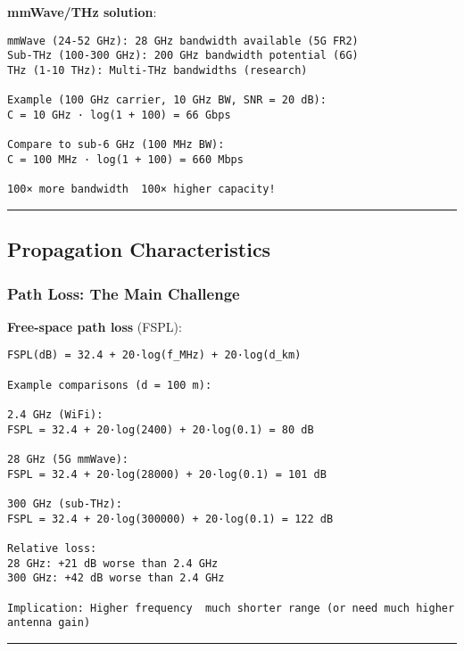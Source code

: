 \textbf{mmWave/THz solution}:

\begin{verbatim}
mmWave (24-52 GHz): 28 GHz bandwidth available (5G FR2)
Sub-THz (100-300 GHz): 200 GHz bandwidth potential (6G)
THz (1-10 THz): Multi-THz bandwidths (research)

Example (100 GHz carrier, 10 GHz BW, SNR = 20 dB):
C = 10 GHz · log(1 + 100) = 66 Gbps

Compare to sub-6 GHz (100 MHz BW):
C = 100 MHz · log(1 + 100) = 660 Mbps

100× more bandwidth  100× higher capacity!
\end{verbatim}

\begin{center}\rule{0.5\linewidth}{0.5pt}\end{center}

\subsection{\texorpdfstring{ Propagation
Characteristics}{ Propagation Characteristics}}\label{propagation-characteristics}

\subsubsection{Path Loss: The Main
Challenge}\label{path-loss-the-main-challenge}

\textbf{Free-space path loss} (FSPL):

\begin{verbatim}
FSPL(dB) = 32.4 + 20·log(f_MHz) + 20·log(d_km)

Example comparisons (d = 100 m):

2.4 GHz (WiFi):
FSPL = 32.4 + 20·log(2400) + 20·log(0.1) = 80 dB

28 GHz (5G mmWave):
FSPL = 32.4 + 20·log(28000) + 20·log(0.1) = 101 dB

300 GHz (sub-THz):
FSPL = 32.4 + 20·log(300000) + 20·log(0.1) = 122 dB

Relative loss:
28 GHz: +21 dB worse than 2.4 GHz
300 GHz: +42 dB worse than 2.4 GHz

Implication: Higher frequency  much shorter range (or need much higher antenna gain)
\end{verbatim}

\begin{center}\rule{0.5\linewidth}{0.5pt}\end{center}

